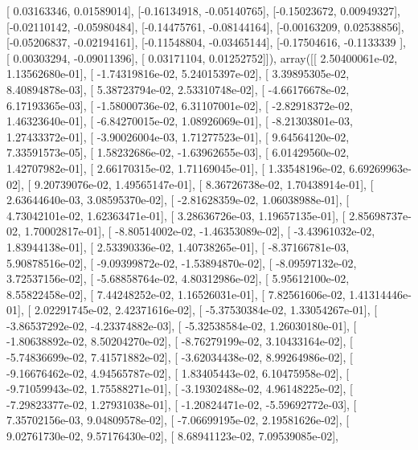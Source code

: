 \documentclass{article}
\begin{document}
       [ 0.03163346,  0.01589014],
       [-0.16134918, -0.05140765],
       [-0.15023672,  0.00949327],
       [-0.02110142, -0.05980484],
       [-0.14475761, -0.08144164],
       [-0.00163209,  0.02538856],
       [-0.05206837, -0.02194161],
       [-0.11548804, -0.03465144],
       [-0.17504616, -0.1133339 ],
       [ 0.00303294, -0.09011396],
       [ 0.03171104,  0.01252752]]), array([[  2.50400061e-02,   1.13562680e-01],
       [ -1.74319816e-02,   5.24015397e-02],
       [  3.39895305e-02,   8.40894878e-03],
       [  5.38723794e-02,   2.53310748e-02],
       [ -4.66176678e-02,   6.17193365e-03],
       [ -1.58000736e-02,   6.31107001e-02],
       [ -2.82918372e-02,   1.46323640e-01],
       [ -6.84270015e-02,   1.08926069e-01],
       [ -8.21303801e-03,   1.27433372e-01],
       [ -3.90026004e-03,   1.71277523e-01],
       [  9.64564120e-02,   7.33591573e-05],
       [  1.58232686e-02,  -1.63962655e-03],
       [  6.01429560e-02,   1.42707982e-01],
       [  2.66170315e-02,   1.71169045e-01],
       [  1.33548196e-02,   6.69269963e-02],
       [  9.20739076e-02,   1.49565147e-01],
       [  8.36726738e-02,   1.70438914e-01],
       [  2.63644640e-03,   3.08595370e-02],
       [ -2.81628359e-02,   1.06038988e-01],
       [  4.73042101e-02,   1.62363471e-01],
       [  3.28636726e-03,   1.19657135e-01],
       [  2.85698737e-02,   1.70002817e-01],
       [ -8.80514002e-02,  -1.46353089e-02],
       [ -3.43961032e-02,   1.83944138e-01],
       [  2.53390336e-02,   1.40738265e-01],
       [ -8.37166781e-03,   5.90878516e-02],
       [ -9.09399872e-02,  -1.53894870e-02],
       [ -8.09597132e-02,   3.72537156e-02],
       [ -5.68858764e-02,   4.80312986e-02],
       [  5.95612100e-02,   8.55822458e-02],
       [  7.44248252e-02,   1.16526031e-01],
       [  7.82561606e-02,   1.41314446e-01],
       [  2.02291745e-02,   2.42371616e-02],
       [ -5.37530384e-02,   1.33054267e-01],
       [ -3.86537292e-02,  -4.23374882e-03],
       [ -5.32538584e-02,   1.26030180e-01],
       [ -1.80638892e-02,   8.50204270e-02],
       [ -8.76279199e-02,   3.10433164e-02],
       [ -5.74836699e-02,   7.41571882e-02],
       [ -3.62034438e-02,   8.99264986e-02],
       [ -9.16676462e-02,   4.94565787e-02],
       [  1.83405443e-02,   6.10475958e-02],
       [ -9.71059943e-02,   1.75588271e-01],
       [ -3.19302488e-02,   4.96148225e-02],
       [ -7.29823377e-02,   1.27931038e-01],
       [ -1.20824471e-02,  -5.59692772e-03],
       [  7.35702156e-03,   9.04809578e-02],
       [ -7.06699195e-02,   2.19581626e-02],
       [  9.02761730e-02,   9.57176430e-02],
       [  8.68941123e-02,   7.09539085e-02],
\end{document}
